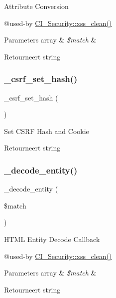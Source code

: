 Attribute Conversion

@used-\/by \mbox{\hyperlink{class_c_i___security_acb759426dbab128d3d8164805225381c}{C\+I\+\_\+\+Security\+::xss\+\_\+clean()}} 
\begin{DoxyParams}[1]{Parameters}
array & {\em \$match} & \\
\hline
\end{DoxyParams}
\begin{DoxyReturn}{Retourneert}
string 
\end{DoxyReturn}
\mbox{\label{class_c_i___security_a7064dd5501c1dfab05ba6ac8838beb01}} 
\subsubsection{\texorpdfstring{\_csrf\_set\_hash()}{\_csrf\_set\_hash()}}
{\footnotesize\ttfamily \+\_\+csrf\+\_\+set\+\_\+hash (\begin{DoxyParamCaption}{ }\end{DoxyParamCaption})\hspace{0.3cm}{\ttfamily [protected]}}

Set C\+S\+RF Hash and Cookie

\begin{DoxyReturn}{Retourneert}
string 
\end{DoxyReturn}
\mbox{\label{class_c_i___security_a5289832cb3ae9cee3c12e82ede958874}} 
\subsubsection{\texorpdfstring{\_decode\_entity()}{\_decode\_entity()}}
{\footnotesize\ttfamily \+\_\+decode\+\_\+entity (\begin{DoxyParamCaption}\item[{}]{\$match }\end{DoxyParamCaption})\hspace{0.3cm}{\ttfamily [protected]}}

H\+T\+ML Entity Decode Callback

@used-\/by \mbox{\hyperlink{class_c_i___security_acb759426dbab128d3d8164805225381c}{C\+I\+\_\+\+Security\+::xss\+\_\+clean()}} 
\begin{DoxyParams}[1]{Parameters}
array & {\em \$match} & \\
\hline
\end{DoxyParams}
\begin{DoxyReturn}{Retourneert}
string 
\end{DoxyReturn}
\mbox{\label{class_c_i___security_a61217e43f888cdf8afb1fba16b5cd9f6}} 
